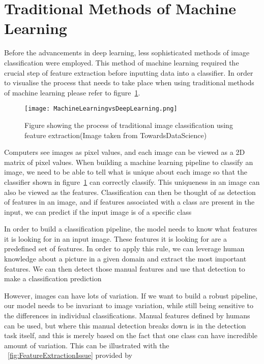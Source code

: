 \section{Traditional Methods of Machine Learning}
Before the advancements in deep learning, less sophisticated methods of image classification were employed. This method of machine learning required the crucial step of feature extraction before inputting data into a classifier. In order to visualise the process that needs to take place when using traditional methods of machine learning please refer to figure~\ref{fig:FeatureExtraction}.


	

\begin{figure}[H]
	\centering
	\texttt{[image: MachineLearningvsDeepLearning.png]}
	\caption{Figure showing the process of traditional image classification using feature extraction(Image taken from TowardsDataScience)}
	\label{fig:FeatureExtraction}
\end{figure}


 Computers see images as pixel values, and each image can be viewed as a 2D matrix of pixel values. When building a machine learning pipeline to classify an image, we need to be able to tell what is unique about each image so that the classifier shown in figure~\ref{fig:FeatureExtraction} can correctly classify. This uniqueness in an image can also be viewed as the features. Classification can then be thought of as detection of features in an image, and if features associated with a class are present in the input, we can predict if the input image is of a specific class \cite{MIT.2019}


 In order to build a classification pipeline, the model needs to know what features it is looking for in an input image. These features it is looking for are a predefined set of features. In order to apply this rule, we can leverage human knowledge about a picture in a given domain and extract the most important features. We can then detect those manual features and use that detection to make a classification prediction \cite{popescu2014feature}

 However, images can have lots of variation. If we want to build a robust pipeline, our model needs to be invariant to image variation, while still being sensitive to the differences in individual classifications. Manual features defined by humans can be used, but where this manual detection breaks down is in the detection task itself, and this is merely based on the fact that one class can have incredible amount of variation. This can be illustrated with the ~\ref{fig:FeatureExtractionIssue} provided by \cite{szegedy2015going}
 
